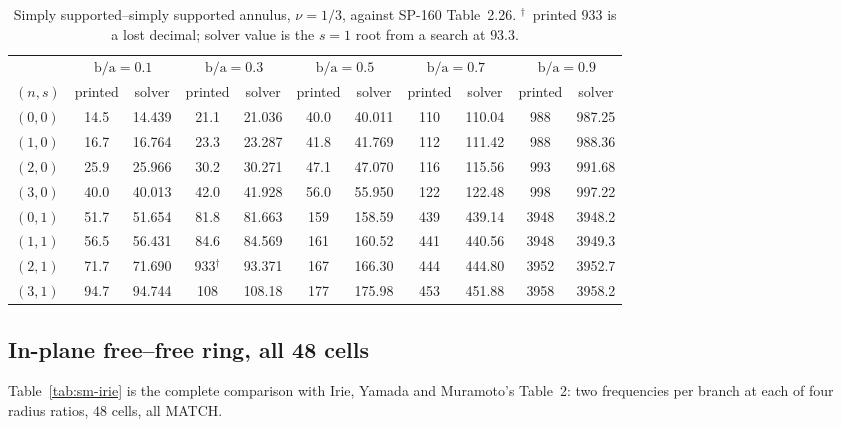 \documentclass[11pt]{article}
\newcommand{\ba}{\mbox{b/a}}
\begin{document}
\begin{table}[htbp]\centering\footnotesize
\caption{Simply supported--simply supported annulus, $\nu=1/3$, against
SP-160 Table~2.26. $^{\dagger}$~printed $933$ is a lost decimal; solver
value is the $s=1$ root from a search at $93.3$.}
\label{tab:sm-t226-nu13}
\begin{tabular}{lcccccccccc}
\toprule
& \multicolumn{2}{c}{$\ba=0.1$} & \multicolumn{2}{c}{$\ba=0.3$}
& \multicolumn{2}{c}{$\ba=0.5$} & \multicolumn{2}{c}{$\ba=0.7$}
& \multicolumn{2}{c}{$\ba=0.9$}\\
\cmidrule(lr){2-3}\cmidrule(lr){4-5}\cmidrule(lr){6-7}\cmidrule(lr){8-9}\cmidrule(lr){10-11}
$(n,s)$ & printed & solver & printed & solver & printed & solver
& printed & solver & printed & solver\\
\midrule
$(0,0)$ & 14.5 & 14.439 & 21.1 & 21.036 & 40.0 & 40.011 & 110 & 110.04 & 988 & 987.25 \\
$(1,0)$ & 16.7 & 16.764 & 23.3 & 23.287 & 41.8 & 41.769 & 112 & 111.42 & 988 & 988.36 \\
$(2,0)$ & 25.9 & 25.966 & 30.2 & 30.271 & 47.1 & 47.070 & 116 & 115.56 & 993 & 991.68 \\
$(3,0)$ & 40.0 & 40.013 & 42.0 & 41.928 & 56.0 & 55.950 & 122 & 122.48 & 998 & 997.22 \\
$(0,1)$ & 51.7 & 51.654 & 81.8 & 81.663 & 159 & 158.59 & 439 & 439.14 & 3948 & 3948.2 \\
$(1,1)$ & 56.5 & 56.431 & 84.6 & 84.569 & 161 & 160.52 & 441 & 440.56 & 3948 & 3949.3 \\
$(2,1)$ & 71.7 & 71.690 & 933$^{\dagger}$ & 93.371 & 167 & 166.30 & 444 & 444.80 & 3952 & 3952.7 \\
$(3,1)$ & 94.7 & 94.744 & 108 & 108.18 & 177 & 175.98 & 453 & 451.88 & 3958 & 3958.2 \\
\bottomrule
\end{tabular}
\end{table}

\FloatBarrier
\subsection{In-plane free--free ring, all 48 cells}\label{sec:sm-irie}
Table~\ref{tab:sm-irie} is the complete comparison with Irie, Yamada and
Muramoto's Table~2: two frequencies per branch at each of four radius ratios,
$48$ cells, all MATCH.
\end{document}

